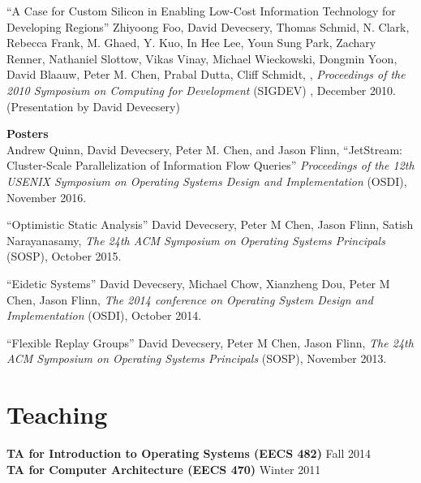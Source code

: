 \documentclass[margin, 10pt]{res} %
\begin{document}
\begin{resume}
``A Case for Custom Silicon in Enabling Low-Cost Information
Technology for Developing Regions'' Zhiyoong Foo, David Devecsery,
Thomas Schmid, N. Clark, Rebecca Frank, M. Ghaed, Y. Kuo, In Hee Lee,
Youn Sung Park, Zachary Renner, Nathaniel Slottow, Vikas Vinay,
Michael Wieckowski, Dongmin Yoon, David Blaauw, Peter M. Chen, Prabal
Dutta, Cliff Schmidt,  , {\sl Proceedings of the 2010 Symposium on
Computing for Development} (SIGDEV) , December 2010. (Presentation by
David Devecsery)

\textbf{Posters}\\
Andrew Quinn, David Devecsery, Peter M. Chen, and Jason Flinn,
``JetStream: Cluster-Scale Parallelization of Information Flow
Queries'' {\sl Proceedings of the 12th USENIX Symposium on Operating
Systems Design and Implementation} (OSDI), November 2016.

``Optimistic Static Analysis'' David Devecsery, Peter M Chen, Jason
Flinn, Satish Narayanasamy, {\sl The 24th ACM Symposium on Operating
Systems Principals} (SOSP), October 2015.

``Eidetic Systems'' David Devecsery, Michael Chow, Xianzheng Dou,
Peter M Chen, Jason Flinn, {\sl The 2014 conference
on Operating System Design and Implementation} (OSDI), October 2014.

``Flexible Replay Groups'' David Devecsery, Peter M Chen, Jason Flinn,
{\sl The 24th ACM Symposium on Operating Systems
Principals} (SOSP), November 2013.

\section{Teaching}
\textbf{TA for Introduction to Operating Systems (EECS 482)} \hfill Fall 2014 \\
\textbf{TA for Computer Architecture (EECS 470)} \hfill Winter 2011 \\

%
%
%


\end{resume}
\end{document}

